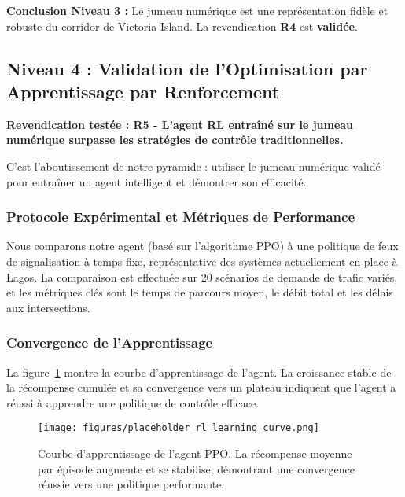 \textbf{Conclusion Niveau 3 :} Le jumeau numérique est une représentation fidèle et robuste du corridor de Victoria Island. La revendication \textbf{R4} est \textbf{validée}.


\subsection{Niveau 4 : Validation de l'Optimisation par Apprentissage par Renforcement}
\label{sec:validation_rl}

\textbf{Revendication testée : R5 - L'agent RL entraîné sur le jumeau numérique surpasse les stratégies de contrôle traditionnelles.}

C'est l'aboutissement de notre pyramide : utiliser le jumeau numérique validé pour entraîner un agent intelligent et démontrer son efficacité.

\subsubsection{Protocole Expérimental et Métriques de Performance}
\label{subsec:protocole_rl}

Nous comparons notre agent (basé sur l'algorithme PPO) à une politique de feux de signalisation à temps fixe, représentative des systèmes actuellement en place à Lagos. La comparaison est effectuée sur 20 scénarios de demande de trafic variés, et les métriques clés sont le temps de parcours moyen, le débit total et les délais aux intersections.

\subsubsection{Convergence de l'Apprentissage}
\label{subsec:convergence_rl}

La figure~\ref{fig:rl_learning_curve_revised} montre la courbe d'apprentissage de l'agent. La croissance stable de la récompense cumulée et sa convergence vers un plateau indiquent que l'agent a réussi à apprendre une politique de contrôle efficace.

\begin{figure}[htbp]
    \centering
    \texttt{[image: figures/placeholder\_rl\_learning\_curve.png]}
    \caption{Courbe d'apprentissage de l'agent PPO. La récompense moyenne par épisode augmente et se stabilise, démontrant une convergence réussie vers une politique performante.}
    \label{fig:rl_learning_curve_revised}
\end{figure}

